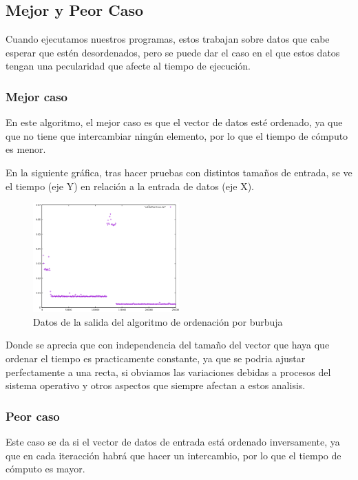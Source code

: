 \subsection{Mejor y Peor Caso}

Cuando ejecutamos nuestros programas, estos trabajan sobre datos que cabe esperar que estén desordenados, pero se puede dar el caso en el que estos datos tengan una pecularidad que afecte al tiempo de ejecución.

\subsubsection{Mejor caso}

En este algoritmo, el mejor caso es que el vector de datos esté ordenado, ya que que no tiene que intercambiar ningún elemento, por lo que el tiempo de cómputo es menor.

En la siguiente gráfica, tras hacer pruebas con distintos tamaños de entrada, se ve el tiempo (eje Y) en relación a la entrada de datos (eje X).

\begin{figure}[ht]
  \centering
  \includegraphics[width=0.5\textwidth]{./Imagenes/mejorCaso.png}
  \caption{Datos de la salida del algoritmo de ordenación por burbuja}
\end{figure}

Donde se aprecia que con independencia del tamaño del vector que haya que ordenar el tiempo es practicamente constante, ya que se podria ajustar perfectamente a una recta, si obviamos las variaciones debidas a procesos del sistema operativo y otros aspectos que siempre afectan a estos analisis.

\subsubsection{Peor caso}

Este caso se da si el vector de datos de entrada está ordenado inversamente, ya que en cada iteracción habrá que hacer un intercambio, por lo que el tiempo de cómputo es mayor.

